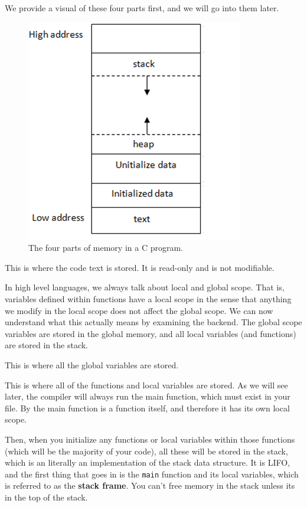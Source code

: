 \documentclass{article}
\begin{document}
    We provide a visual of these four parts first, and we will go into them later. 
    \begin{figure}[H]
      \centering 
      \includegraphics[scale=0.6]{img/memory_layout.png}
      \caption{The four parts of memory in a C program.} 
      \label{fig:memory_layout} 
    \end{figure}

    \begin{definition}
      This is where the code text is stored. It is read-only and is not modifiable.
    \end{definition}

    In high level languages, we always talk about local and global scope. That is, variables defined within functions have a local scope in the sense that anything we modify in the local scope does not affect the global scope. We can now understand what this actually means by examining the backend.  The global scope variables are stored in the global memory, and all local variables (and functions) are stored in the stack. 


    \begin{definition}
      This is where all the global variables are stored. 
    \end{definition}

    \begin{definition}
      This is where all of the functions and local variables are stored. As we will see later, the compiler will always run the main function, which must exist in your file. By the main function is a function itself, and therefore it has its own local scope. 

      Then, when you initialize any functions or local variables within those functions (which will be the majority of your code), all these will be stored in the stack, which is an literally an implementation of the stack data structure. It is LIFO, and the first thing that goes in is the \texttt{main} function and its local variables, which is referred to as the \textbf{stack frame}. You can't free memory in the stack unless its in the top of the stack. 
    \end{definition}
\end{document}
